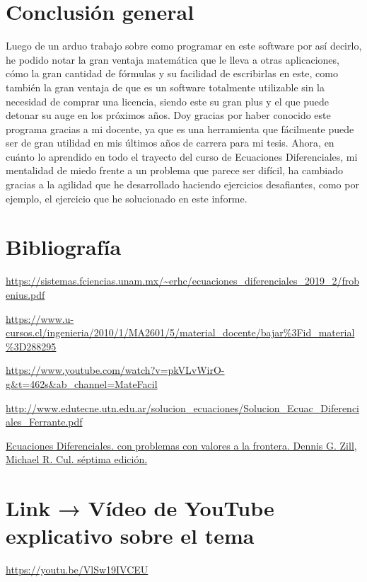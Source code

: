 \documentclass{article}
\begin{document}
\section{Conclusión general}
\large Luego de un arduo trabajo sobre como programar en este software por así decirlo, he podido notar la gran ventaja matemática que le lleva a otras aplicaciones, cómo la gran cantidad de fórmulas y su facilidad de escribirlas en este, como también la gran ventaja de que es un software totalmente utilizable sin la necesidad de comprar una licencia, siendo este su gran plus y el que puede detonar su auge en los próximos años. Doy gracias por haber conocido este programa gracias a mi docente, ya que es una herramienta que fácilmente puede ser de gran utilidad en mis últimos años de carrera para mi tesis. Ahora, en cuánto lo aprendido en todo el trayecto del curso de Ecuaciones Diferenciales, mi mentalidad de miedo frente a un problema que parece ser difícil, ha cambiado gracias a la agilidad que he desarrollado haciendo ejercicios desafiantes, como por ejemplo, el ejercicio que he solucionado en este informe.\newpage

\section{Bibliografía} 

\large\url {https://sistemas.fciencias.unam.mx/~erhc/ecuaciones_diferenciales_2019_2/frobenius.pdf}\newline

\large\url {https://www.u-cursos.cl/ingenieria/2010/1/MA2601/5/material_docente/bajar%3Fid_material%3D288295}\newline

\large\url {https://www.youtube.com/watch?v=pkVLvWirO-g&t=462s&ab_channel=MateFacil}\newline

\large\url {http://www.edutecne.utn.edu.ar/solucion_ecuaciones/Solucion_Ecuac_Diferenciales_Ferrante.pdf}\newline

\large\url {Ecuaciones Diferenciales. con problemas con valores a la frontera. Dennis G. Zill, Michael R. Cul. séptima edición.}\newline

\section{Link → Vídeo de YouTube  explicativo sobre el tema}

\large\url {https://youtu.be/VlSw19IVCEU}
\end{document}
